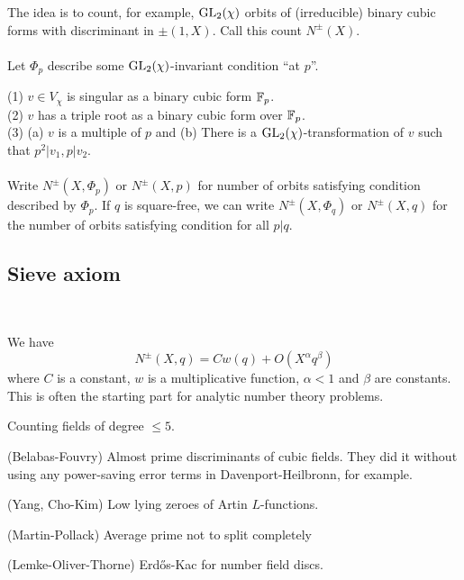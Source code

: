 \documentclass[12pt,amsfont]{amsart}
\begin{document}
The idea is to count, for example, $\operatorname{GL}_2(\chi)$ orbits of (irreducible) binary cubic forms with discriminant in $\pm(1, X)$. Call this count $N^{\pm}(X)$. \\ \\
Let $\Phi_p$ describe some $\operatorname{GL}_2(\chi)$-invariant condition ``at $p$''. 

(1) $v \in V_\chi$ is singular as a binary cubic form ${\mathbb F}_p$. \\
(2) $v$ has a triple root as a binary cubic form over ${\mathbb F}_p$. \\
(3) (a) $v$ is a multiple of $p$ and (b) There is a $\operatorname{GL}_2(\chi)$-transformation of $v$ such that $p^2 | v_1, p | v_2$. \\ \\
Write $N^{\pm}(X, \Phi_p)$ or $N^{\pm}(X, p)$ for number of orbits satisfying condition described by $\Phi_p$. If $q$ is square-free, we can write $N^{\pm}(X, \Phi_q)$ or $N^{\pm}(X, q)$ for the number of orbits satisfying condition for all $p | q$. 
\subsection{Sieve axiom}
{\ }

We have 
\[
N^\pm(X,q) = C w(q) + O(X^\alpha q^\beta)
\]
 where $C$ is a constant, $w$ is a multiplicative function, $\alpha < 1$ and $\beta$ are constants. This is often the starting part for analytic number theory problems. 

\begin{xmp} Counting fields of degree $\leq 5$.
\end{xmp}

\begin{xmp} (Belabas-Fouvry) Almost prime discriminants of cubic fields. They did it without using any power-saving error terms in Davenport-Heilbronn, for example.
\end{xmp}

\begin{xmp} (Yang, Cho-Kim) Low lying zeroes of Artin $L$-functions. 
\end{xmp}

\begin{xmp} (Martin-Pollack) Average prime not to split completely 
\end{xmp}

\begin{xmp} (Lemke-Oliver-Thorne) Erd\H{o}s-Kac for number field discs. 
\end{xmp}
\end{document}
